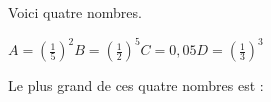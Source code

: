 
Voici quatre nombres.

\smallskip

$A=\left(\frac{1}{5}\right)^{2}$\hfill$B=\left(\frac{1}{2}\right)^{5}$\hfill$C=0,05$\hfill$D=\left(\frac{1}{3}\right)^{3}$\hfill\null

\smallskip

Le plus grand de ces quatre nombres est :

\smallskip

